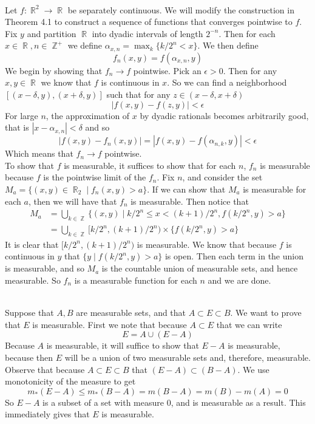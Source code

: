\documentclass{article}
\DeclareMathOperator{\Z}{\mathbb{Z}}
\DeclareMathOperator{\R}{\mathbb{R}}
\DeclareMathOperator{\suchthat}{\mathrel{|}}
\newcommand{\problem}[1]{\noindent{\textbf{Problem #1}}\\}
\begin{document}
\problem{1.6.23} Let $f: \R^2 \to \R$ be separately continuous. We will modify the construction in Theorem 4.1 to construct a sequence of functions that converges pointwise to $f$. Fix $y$ and partition $\R$ into dyadic intervals of length $2^{-n}$. Then for each $x\in \R, n\in \Z^+$ we define $\alpha_{x,n} = \max_k \{k/2^n < x\}$. We then define 
\[
f_n(x,y) = f(\alpha_{x,n}, y)
\]  
We begin by showing that $f_n \to f$ pointwise. Pick an $\epsilon > 0$. Then for any $x,y \in \R$ we know that $f$ is continuous in $x$. So we can find a neighborhood $[(x - \delta, y), (x+\delta, y)]$ such that for any $z \in (x-\delta, x+\delta)$ 
\[
|f(x,y) - f(z, y)| < \epsilon
\]
For large $n$, the approximation of $x$ by dyadic rationals becomes arbitrarily good, that is $|x - \alpha_{x,n}| < \delta$ and so 
\[
|f(x,y) - f_n(x,y)| = |f(x,y) - f(\alpha_{n,k}, y)| < \epsilon
\]
Which means that $f_n\to f$ pointwise. \\
\indent To show that $f$ is measurable, it suffices to show that for each $n$, $f_n$ is measurable because $f$ is the pointwise limit of the $f_n$. Fix $n$, and consider the set $M_a = \{(x,y) \in \R_2 \suchthat f_n(x,y) > a\}$. If we can show that $M_a$ is measurable for each $a$, then we will have that $f_n$ is measurable. Then notice that 
\begin{align*}
M_a &= \bigcup_{k\in \Z} \{(x,y) \suchthat k/2^n \leq x < (k+1)/2^n, f(k/2^n, y) > a\} \\
&= \bigcup_{k\in \Z} [k/2^n, (k+1)/2^n) \times \{f(k/2^n,y) > a\}
\end{align*}
It is clear that $[k/2^n, (k+1)/2^n)$ is measurable. We know that because $f$ is continuous in $y$ that $\{y \suchthat f(k/2^n, y) > a\}$ is open. Then each term in the union is measurable, and so $M_a$ is the countable union of measurable sets, and hence measurable. So $f_n$ is a measurable function for each $n$ and we are done. 
 
\problem{1.6.26} Suppose that $A,B$ are measurable sets, and that $A \subset E \subset B$. We want to prove that $E$ is measurable. First we note that because $A\subset E$ that we can write
\[
E = A \cup (E - A)
\]
Because $A$ is measurable, it will suffice to show that $E-A$ is measurable, because then $E$ will be a union of two measurable sets and, therefore, measurable. Observe that because $A \subset E \subset B$ that $(E-A) \subset (B-A)$. We use monotonicity of the measure to get
\[
m_*(E-A) \leq m_*(B-A) = m(B-A) = m(B) - m(A) = 0
\]
So $E-A$ is a subset of a set with measure $0$, and is measurable as a result. This immediately gives that $E$ is measurable. 
\end{document}
